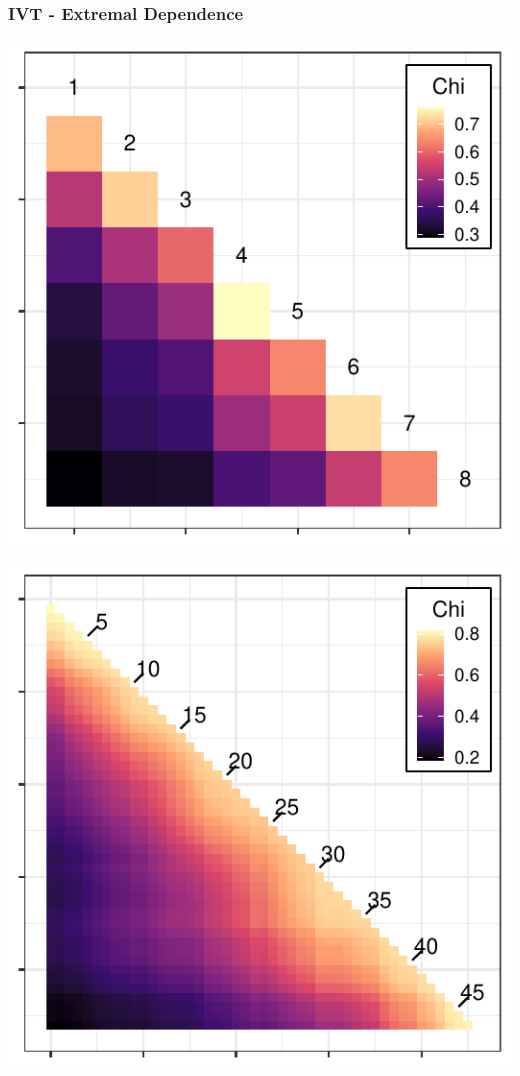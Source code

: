 \documentclass[aspectratio=169]{beamer}
\begin{document}
\begin{frame}
  \frametitle{IVT - Extremal Dependence}
  \begin{minipage}{.49\textwidth}
    \centering
    \includegraphics[width=0.99\linewidth]{./images/chi_ij_8}
  \end{minipage}
  \begin{minipage}{.49\textwidth}
    \centering
    \includegraphics[width=0.99\linewidth]{./images/chi_ij_46}
  \end{minipage}
\end{frame}
\end{document}
